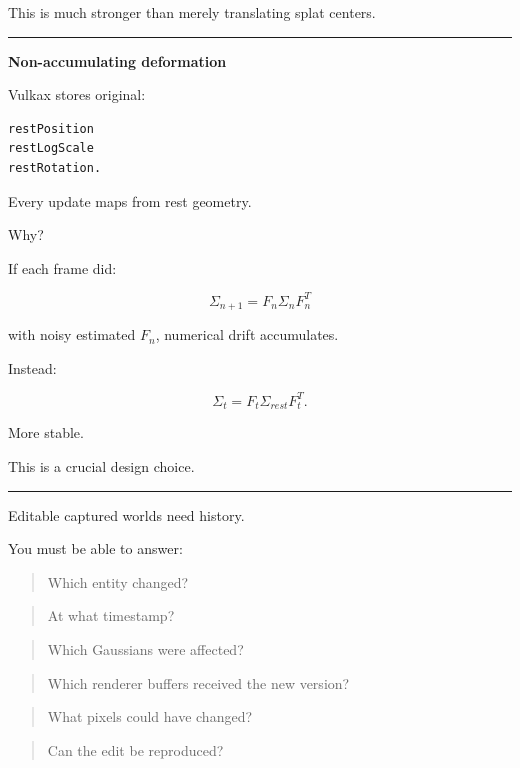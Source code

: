 This is much stronger than merely translating splat centers.

\begin{center}\rule{0.5\linewidth}{0.5pt}\end{center}

\textbf{Non-accumulating deformation}

Vulkax stores original:

\protect{}\label{npbq8r}%
\begin{verbatim}
restPosition
restLogScale
restRotation.
\end{verbatim}

Every update maps from rest geometry.

Why?

If each frame did:

\[
\Sigma_{n+1}
=
F_n
\Sigma_n
F_n^T
\]

with noisy estimated \(F_n\), numerical drift accumulates.

Instead:

\[
\boxed{
\Sigma_t
=
F_t
\Sigma_{rest}
F_t^T.
}
\]

More stable.

This is a crucial design choice.

\begin{center}\rule{0.5\linewidth}{0.5pt}\end{center}

Editable captured worlds need history.

You must be able to answer:

\begin{quote}
Which entity changed?
\end{quote}

\begin{quote}
At what timestamp?
\end{quote}

\begin{quote}
Which Gaussians were affected?
\end{quote}

\begin{quote}
Which renderer buffers received the new version?
\end{quote}

\begin{quote}
What pixels could have changed?
\end{quote}

\begin{quote}
Can the edit be reproduced?
\end{quote}

